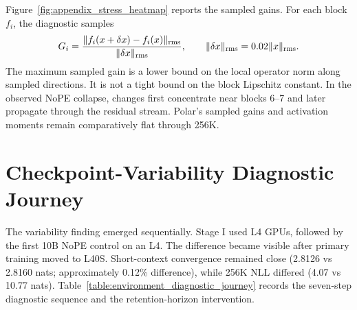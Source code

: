 Figure~\ref{fig:appendix_stress_heatmap} reports the sampled gains. For each block $f_i$, the diagnostic samples
\begin{equation}
G_i=\frac{\lVert f_i(x+\delta x)-f_i(x)\rVert_{\rm rms}}{\lVert\delta x\rVert_{\rm rms}},
\qquad \lVert\delta x\rVert_{\rm rms}=0.02\lVert x\rVert_{\rm rms}.
\end{equation}
The maximum sampled gain is a lower bound on the local operator norm along sampled directions. It is not a tight bound on the block Lipschitz constant. In the observed NoPE collapse, changes first concentrate near blocks 6--7 and later propagate through the residual stream. Polar's sampled gains and activation moments remain comparatively flat through 256K.

\section{Checkpoint-Variability Diagnostic Journey}
\label{appendix:environment}

The variability finding emerged sequentially. Stage I used L4 GPUs, followed by the first 10B NoPE control on an L4. The difference became visible after primary training moved to L40S. Short-context convergence remained close (2.8126 vs 2.8160 nats; approximately 0.12\% difference), while 256K NLL differed (4.07 vs 10.77 nats). Table~\ref{table:environment_diagnostic_journey} records the seven-step diagnostic sequence and the retention-horizon intervention.

